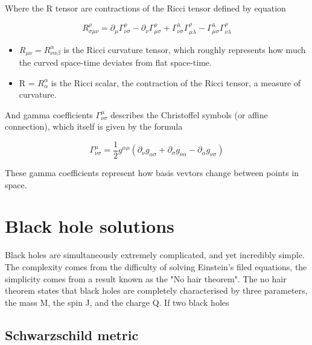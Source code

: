 \documentclass{article}
\begin{document}
Where the R tensor are contractions of the Ricci tensor defined by equation 

\begin{equation}
    R_{\sigma \mu \nu }^{\rho }=\partial_{\mu} \Gamma _{\nu \sigma }^{\rho }-\partial_\nu \Gamma _{\mu \sigma }^{\rho }+\Gamma _{\nu \sigma }^{\lambda } \Gamma _{\mu \lambda }^{\rho }-\Gamma _{\mu \sigma }^{\lambda } \Gamma _{\nu \lambda }^{\rho }
\label{eq:Riemann tesnor}
\end{equation}


\begin{itemize}
    \item $R_{\mu \nu} = R^{\alpha}_{\nu \alpha \beta}$ is the Ricci curvature tensor, which roughly represents how much the curved space-time deviates from flat space-time.
    \item R = $R^{\alpha}_{\alpha}$ is the Ricci scalar, the contraction of the Ricci tensor, a measure of curvature.
\end{itemize}

And gamma coefficients $\Gamma^{\mu}_{\nu \sigma}$ describes the Christoffel symbols (or affine connection), which itself is given by the formula

\begin{equation}
    \Gamma^{\mu}_{\nu \sigma} = \frac{1}{2} g^{\alpha \mu} (\partial_{\nu}g_{\alpha \sigma}+\partial_{\sigma} g_{\nu \alpha} - \partial_{\alpha} g_{\nu \sigma})
\label{eq:Christoffel symbol}
\end{equation}

These gamma coefficients represent how basis vevtors change between points in space.


\section{Black hole solutions}\label{sec:BH soln}

Black holes are simultaneously extremely complicated, and yet incredibly simple. The complexity comes from the difficulty of solving Einstein's filed equations, the simplicity comes from a result known as the "No hair theorem". The no hair theorem states that black holes are completely characterised by three parameters, the mass M, the spin J, and the charge Q. If two black holes 

\subsection{Schwarzschild metric}
\end{document}
